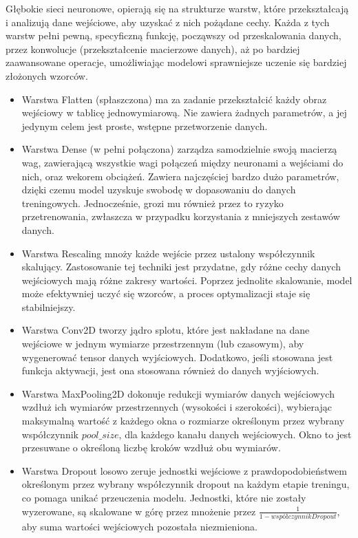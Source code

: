 Głębokie sieci neuronowe, opierają się na strukturze warstw,
które przekształcają i analizują dane wejściowe, aby uzyskać z nich pożądane cechy.
Każda z tych warstw pełni pewną, specyficzną funkcję, począwszy od przeskalowania danych,
przez konwolucje (przekształcenie macierzowe danych),
aż po bardziej zaawansowane operacje, umożliwiając modelowi sprawniejsze uczenie się bardziej złożonych wzorców.
\begin{itemize}[label=-,labelsep=0.4cm,leftmargin=0.6cm]   
	\item Warstwa Flatten (spłaszczona) ma za zadanie przekształcić każdy obraz wejściowy w tablicę jednowymiarową.
		Nie zawiera żadnych parametrów, a jej jedynym celem jest proste, wstępne przetworzenie danych.
	\item Warstwa Dense (w pełni połączona) zarządza samodzielnie swoją macierzą wag,
		zawierającą wszystkie wagi połączeń między neuronami a wejściami do nich, oraz wekorem obciążeń.
		Zawiera najczęściej bardzo dużo parametrów, dzięki czemu model uzyskuje swobodę w dopasowaniu do danych treningowych.
		Jednocześnie, grozi mu również przez to ryzyko przetrenowania,
		zwłaszcza w przypadku korzystania z mniejszych zestawów danych.
    \item Warstwa Rescaling mnoży każde wejście przez ustalony współczynnik skalujący.
		Zastosowanie tej techniki jest przydatne, gdy różne cechy danych wejściowych mają różne zakresy wartości.
		Poprzez jednolite skalowanie, model może efektywniej uczyć się wzorców, a proces optymalizacji staje się stabilniejszy.
	\item Warstwa Conv2D tworzy jądro splotu, które jest nakładane na dane wejściowe w jednym wymiarze przestrzennym (lub czasowym), 
		aby wygenerować tensor danych wyjściowych.
		Dodatkowo, jeśli stosowana jest funkcja aktywacji, jest ona stosowana również do danych wyjściowych.
	\item Warstwa MaxPooling2D dokonuje redukcji wymiarów danych wejściowych wzdłuż ich wymiarów przestrzennych (wysokości i szerokości),
		wybierając maksymalną wartość z każdego okna o rozmiarze określonym przez wybrany współczynnik $pool\_size$,
		dla każdego kanału danych wejściowych.
		Okno to jest przesuwane o określoną liczbę kroków wzdłuż obu wymiarów.
	\item Warstwa Dropout losowo zeruje jednostki wejściowe z prawdopodobieństwem określonym
		przez wybrany współczynnik dropout na każdym etapie treningu, co pomaga unikać przeuczenia modelu.
		Jednostki, które nie zostały wyzerowane, są skalowane w górę przez mnożenie przez $\frac{1}{1 - współczynnikDropout}$,
		aby suma wartości wejściowych pozostała niezmieniona.
\end{itemize}